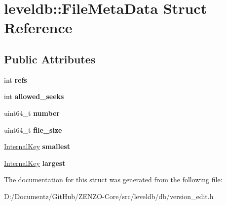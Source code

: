 \hypertarget{structleveldb_1_1_file_meta_data}{}\section{leveldb\+::File\+Meta\+Data Struct Reference}
\label{structleveldb_1_1_file_meta_data}
\subsection*{Public Attributes}
\begin{DoxyCompactItemize}
\item 
\mbox{\label{structleveldb_1_1_file_meta_data_a199e4ba2167c8facad8bd41269982935}} 
int {\bfseries refs}
\item 
\mbox{\label{structleveldb_1_1_file_meta_data_a63f9a0149290c7b22bbc871da6b4f619}} 
int {\bfseries allowed\+\_\+seeks}
\item 
\mbox{\label{structleveldb_1_1_file_meta_data_adc63bac3e06fd4387ebb9f085fc88fe7}} 
uint64\+\_\+t {\bfseries number}
\item 
\mbox{\label{structleveldb_1_1_file_meta_data_a778ea9c773ad4fdfe4408eecaae754f7}} 
uint64\+\_\+t {\bfseries file\+\_\+size}
\item 
\mbox{\label{structleveldb_1_1_file_meta_data_a9e5e5c149495aede836ac637cd89269f}} 
\mbox{\hyperlink{classleveldb_1_1_internal_key}{Internal\+Key}} {\bfseries smallest}
\item 
\mbox{\label{structleveldb_1_1_file_meta_data_a410718ba1868392b298d05a774dd07d1}} 
\mbox{\hyperlink{classleveldb_1_1_internal_key}{Internal\+Key}} {\bfseries largest}
\end{DoxyCompactItemize}


The documentation for this struct was generated from the following file\+:\begin{DoxyCompactItemize}
\item 
D\+:/\+Documentz/\+Git\+Hub/\+Z\+E\+N\+Z\+O-\/\+Core/src/leveldb/db/version\+\_\+edit.\+h\end{DoxyCompactItemize}
